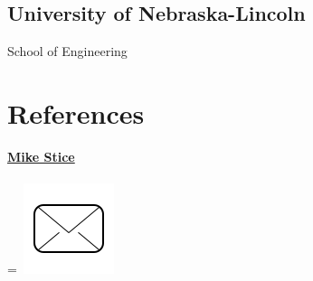\documentclass[]{latex/resume}
\begin{document}
\begin{minipage}[t]{0.25\textwidth}
    \subsection{University of Nebraska-Lincoln}
    School of Engineering\\



    \sectionsep


\section{References}

    \href{}{\textbf{Mike Stice}} \\
     \\
    \begingroup
        =\hbox{ \includegraphics[scale=0.1,trim={0 1cm 0cm 0cm}]{latex/icons/mail.png}\hspace{0.1cm}  }
        \parbox{\wd0}{}
    \endgroup
    

\end{minipage}
\end{document}
